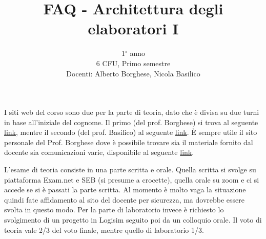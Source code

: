 \documentclass{article}
\title{FAQ - \textbf{Architettura degli elaboratori I}}
\author{
	1$^{\circ}$ anno\\6 CFU, Primo semestre\\
	Docenti: Alberto Borghese, Nicola Basilico\\ 
	\date{}
}
\begin{document}
 

\maketitle
	
\begin{QuestionList}
		
     {
        I siti web del corso sono due per la parte di teoria, dato che è divisa su due turni in base all’iniziale del cognome. 
        Il primo (del prof. Borghese) si trova al seguente \href{https://aborgheseae1.ariel.ctu.unimi.it/v5/home/Default.aspx}{link}, mentre il secondo (del prof. Basilico) al seguente \href{https://nbasilicoae1.ariel.ctu.unimi.it/v5/home/Default.aspx}{link}.
        È sempre utile il sito personale del Prof. Borghese dove è possibile trovare sia il materiale fornito dal docente sia comunicazioni varie, disponibile al seguente \href{http://ais-lab.di.unimi.it/Teaching/Architettura_I/_Arch_I.html}{link}.
	}

		
	 {
		L’esame di teoria consiste in una parte scritta e orale. Quella scritta si svolge su piattaforma Exam.net e SEB (si presume a crocette), quella orale su zoom e ci si accede se si è passati la parte scritta. Al momento è molto vaga la situazione quindi fate affidamento al sito del docente per sicurezza, ma dovrebbe essere svolta in questo modo.
		Per la parte di laboratorio invece è richiesto lo svolgimento di un progetto in Logisim seguito poi da un colloquio orale. Il voto di teoria vale 2/3 del voto finale, mentre quello di laboratorio 1/3.
	}
	
		
		
	\end{QuestionList}
	
\end{document}
